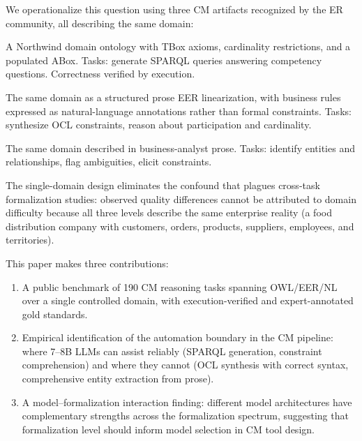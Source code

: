 \documentclass[runningheads]{llncs}
\begin{document}
We operationalize this question using three CM artifacts recognized by the ER community, all describing the same domain:

\begin{description}[noitemsep,style=nextline]
  \item[High-formal: OWL~2 ontology.]
    A Northwind domain ontology with TBox axioms, cardinality restrictions, and a populated ABox. Tasks: generate SPARQL queries answering competency questions. Correctness verified by execution.
  \item[Semi-formal: EER diagram with NL annotations.]
    The same domain as a structured prose EER linearization, with business rules expressed as natural-language annotations rather than formal constraints. Tasks: synthesize OCL constraints, reason about participation and cardinality.
  \item[Low-formal: NL requirements document.]
    The same domain described in business-analyst prose. Tasks: identify entities and relationships, flag ambiguities, elicit constraints.
\end{description}

\noindent The single-domain design eliminates the confound that plagues cross-task formalization studies: observed quality differences cannot be attributed to domain difficulty because all three levels describe the same enterprise reality (a food distribution company with customers, orders, products, suppliers, employees, and territories).

This paper makes three contributions:
\begin{enumerate}[noitemsep]
  \item A public benchmark of 190 CM reasoning tasks spanning OWL/EER/NL over a single controlled domain, with execution-verified and expert-annotated gold standards.
  \item Empirical identification of the automation boundary in the CM pipeline: where 7--8B LLMs can assist reliably (SPARQL generation, constraint comprehension) and where they cannot (OCL synthesis with correct syntax, comprehensive entity extraction from prose).
  \item A model--formalization interaction finding: different model architectures have complementary strengths across the formalization spectrum, suggesting that formalization level should inform model selection in CM tool design.
\end{enumerate}

\end{document}
